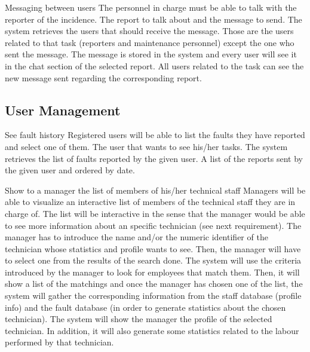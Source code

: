 \begin{requirement}{Messaging between users}
\reqdesc The personnel in charge must be able to talk with the reporter of the incidence.
\reqin The report to talk about and the message to send.
\reqsteps The system retrieves the users that should receive the message. Those are the users related to that task (reporters and maintenance personnel) except the one who sent the message. The message is stored in the system and every user will see it in the chat section of the selected report.
\reqout All users related to the task can see the new message sent regarding the corresponding report.
\end{requirement}


\subsection{User Management}

\begin{requirement}{See fault history}
\reqdesc Registered users will be able to list the faults they have reported and select one of them.
\reqin The user that wants to see his/her tasks.
\reqsteps The system retrieves the list of faults reported by the given user.
\reqout A list of the reports sent by the given user and ordered by date.
\end{requirement}

\begin{requirement}{Show to a manager the list of members of his/her technical staff}
\reqdesc Managers will be able to visualize an interactive list of members of the technical staff they are in charge of. The list will be interactive in the sense that the manager would be able to see more information about an specific technician (see next requirement).
\reqin The manager has to introduce the name and/or the numeric identifier of the technician whose statistics and profile wants to see. Then, the manager will have to select one from the results of the search done.
\reqsteps The system will use the criteria introduced by the manager to look for employees that match them. Then, it will show a list of the matchings and once the manager has chosen one of the list, the system will gather the corresponding information from the staff database (profile info) and the fault database (in order to generate statistics about the chosen technician).
\reqout The system will show the manager the profile of the selected technician. In addition, it will also generate some statistics related to the labour performed by that technician.
\end{requirement}

